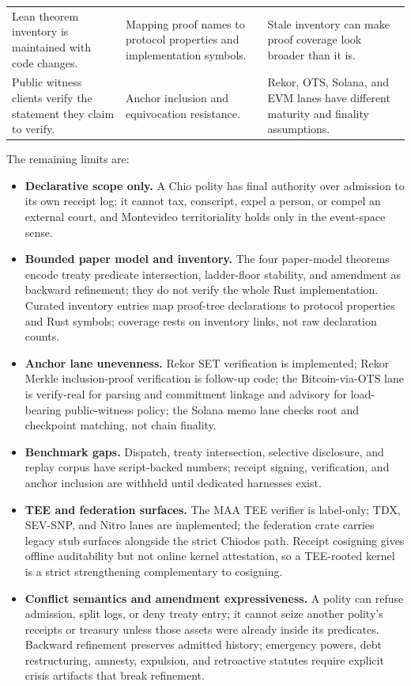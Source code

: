 \begin{table}[t]
\begin{tabularx}{\textwidth}{@{}>{\raggedright\arraybackslash}p{}>{\raggedright\arraybackslash}p{}>{\raggedright\arraybackslash}X@{}}
Lean theorem inventory is maintained with code changes. & Mapping proof names to protocol properties and implementation symbols. & Stale inventory can make proof coverage look broader than it is. \\
Public witness clients verify the statement they claim to verify. & Anchor inclusion and equivocation resistance. & Rekor, OTS, Solana, and EVM lanes have different maturity and finality assumptions. \\
\bottomrule
\end{tabularx}
\end{table}

The remaining limits are:

\begin{itemize}[noitemsep,topsep=2pt,leftmargin=1.2em]
  \item \textbf{Declarative scope only.} A Chio polity has final authority over admission to its own receipt log; it cannot tax, conscript, expel a person, or compel an external court, and Montevideo territoriality holds only in the event-space sense.
  \item \textbf{Bounded paper model and inventory.} The four paper-model theorems encode treaty predicate intersection, ladder-floor stability, and amendment as backward refinement; they do not verify the whole Rust implementation. Curated inventory entries map proof-tree declarations to protocol properties and Rust symbols; coverage rests on inventory links, not raw declaration counts.
  \item \textbf{Anchor lane unevenness.} Rekor SET verification is implemented; Rekor Merkle inclusion-proof verification is follow-up code; the Bitcoin-via-OTS lane is verify-real for parsing and commitment linkage and advisory for load-bearing public-witness policy; the Solana memo lane checks root and checkpoint matching, not chain finality.
  \item \textbf{Benchmark gaps.} Dispatch, treaty intersection, selective disclosure, and replay corpus have script-backed numbers; receipt signing, verification, and anchor inclusion are withheld until dedicated harnesses exist.
  \item \textbf{TEE and federation surfaces.} The MAA TEE verifier is label-only; TDX, SEV-SNP, and Nitro lanes are implemented; the federation crate carries legacy stub surfaces alongside the strict Chiodos path. Receipt cosigning gives offline auditability but not online kernel attestation, so a TEE-rooted kernel is a strict strengthening complementary to cosigning.
  \item \textbf{Conflict semantics and amendment expressiveness.} A polity can refuse admission, split logs, or deny treaty entry; it cannot seize another polity's receipts or treasury unless those assets were already inside its predicates. Backward refinement preserves admitted history; emergency powers, debt restructuring, amnesty, expulsion, and retroactive statutes require explicit crisis artifacts that break refinement.

\end{itemize}
